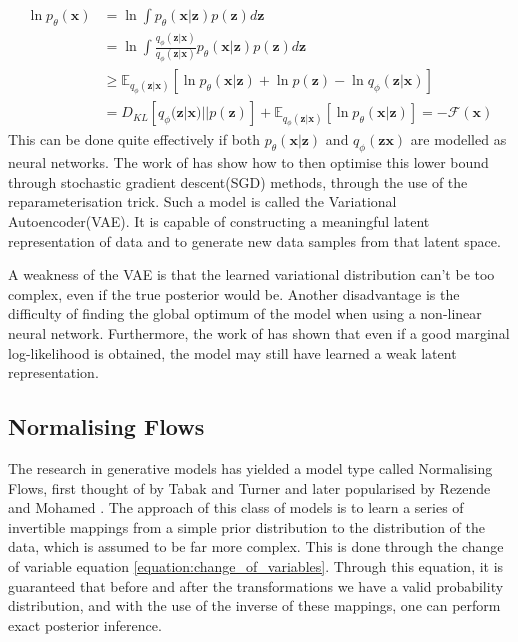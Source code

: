 \documentclass{report}
\newcommand{\E}{\mathbb{E}}
\newcommand{\bx}{\mathbf{x}}
\newcommand{\bz}{\mathbf{z}}
\begin{document}
\begin{equation}\label{equation:negative_free_energy}
    \begin{split}
    \ln p_\theta(\bx) &= \ln \int p_\theta(\bx|\bz)p(\bz) d\bz\\
    &= \ln \int \frac{q_\phi(\bz|\bx)}{q_\phi(\bz|\bx)} p_\theta(\bx|\bz)p(\bz)d\bz\\
    &\geq \E_{q_\phi(\bz|\bx)}[\ln p_\theta(\bx|\bz) + \ln p(\bz) - \ln q_\phi(\bz|\bx)] \\
    &= D_{KL}[q_\phi(\bz|\bx) || p(\bz)] + \E_{q_\phi(\bz|\bx)}[\ln p_\theta(\bx|\bz)]= -\mathcal{F}(\bx)
    \end{split}
\end{equation}
This can be done quite effectively if both $p_\theta(\bx|\bz)$ and $q_\phi(\bz\bx)$ are modelled as neural networks. The work of \cite{kingma2013auto} has show how to then optimise this lower bound through stochastic gradient descent(SGD) methods, through the use of the reparameterisation trick. Such a model is called the Variational Autoencoder(VAE). It is capable of constructing a meaningful latent representation of data and to generate new data samples from that latent space. 

A weakness of the VAE is that the learned variational distribution can't be too complex, even if the true posterior would be. Another disadvantage is the difficulty of finding the global optimum of the model when using a non-linear neural network. Furthermore, the work of \cite{alemi2017fixing} has shown that even if a good marginal log-likelihood is obtained, the model may still have learned a weak latent representation.

\subsection{Normalising Flows}
The research in generative models has yielded a model type called Normalising Flows, first thought of by Tabak and Turner \cite{tabak2013family} and later popularised by Rezende and Mohamed \cite{rezende2016variational}. The approach of this class of models is to learn a series of invertible mappings from a simple prior distribution to the distribution of the data, which is assumed to be far more complex. This is done through the change of variable equation \ref{equation:change_of_variables}. Through this equation, it is guaranteed that before and after the transformations we have a valid probability distribution, and with the use of the inverse of these mappings, one can perform exact posterior inference. 
\end{document}
